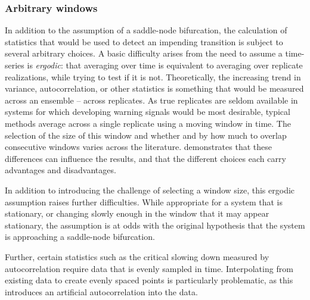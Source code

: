 \documentclass[authoryear,review,11pt]{elsarticle}
\begin{document}






\subsubsection*{Arbitrary windows}
In addition to the assumption of a saddle-node bifurcation, 
the calculation of statistics that would be used to detect an impending transition is subject to several arbitrary choices.
A basic difficulty arises from the need to assume a time-series is \emph{ergodic}: 
that averaging over time is equivalent to averaging over replicate realizations,
while trying to test if it is not.
Theoretically, the increasing trend in variance, autocorrelation, or other statistics
is something that would be measured across an ensemble -- across replicates. %
As true replicates are seldom available in systems for which developing warning signals would be most desirable,
typical methods average across a single replicate using a moving window in time.
The selection of the size of this window and whether and by how much to overlap consecutive windows
varies across the literature.
\citet{Lenton2012} demonstrates that these differences can influence the results,
and that the different choices each carry advantages and disadvantages.

In addition to introducing the challenge of selecting a window size,
this ergodic assumption raises further difficulties.
While appropriate for a system that is stationary,
or changing slowly enough in the window that it may appear stationary,
the assumption is at odds with the original hypothesis
that the system is approaching a saddle-node bifurcation.

Further, certain statistics such as the critical slowing down measured by autocorrelation
require data that is evenly sampled in time.
Interpolating from existing data to create evenly spaced points is particularly problematic,
as this introduces an artificial autocorrelation into the data.
\end{document}
